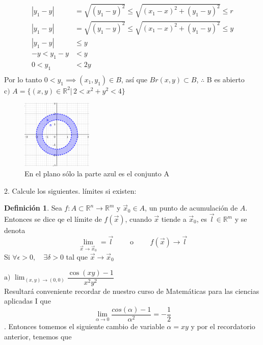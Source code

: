 \documentclass[letterpaper]{article}
\providecommand{\abs}[1]{\left|#1\right|}
\newcommand{\R}{\mathds{R}}
\renewcommand{\*}{\cdot}
\theoremstyle{definition}
\newtheorem{definition}{Definición}
\begin{document}
\begin{align*}
	\abs{y_1 - y} &= \sqrt{(y_1 -y)^2} \leq \sqrt{(x_1 - x)^2 + (y_1 - y)^2} \leq r\\
	\abs{y_1 - y} &= \sqrt{(y_1 -y)^2} \leq \sqrt{(x_1 - x)^2 + (y_1 - y)^2} \leq y\\
	\abs{y_1 - y} &\leq y\\
	-y<y_1 - y &< y\\
	0<y_1  &< 2y\\
\end{align*}
Por lo tanto $  0< y_1 \implies (x_1, y_1) \in B$, así que $ Br(x,y) \subset B $, $ \therefore  $ B es abierto\\



\noindent$\text{c) }A = \{ (x,y) \in \mathbb{R}^2 \vert \, 2 < x^2  + y^2 < 4\}$
\begin{figure}[h]
	\centering
	\includegraphics[width=0.3\textwidth]{1c}
	\caption{En el plano sólo la parte azul es el conjunto A}
\end{figure}


2.  Calcule los siguientes. límites si existen: 
\begin{definition}
	Sea $ f: A \subset \R^n \to \R^m $ y $ \vec{x}_0 \in A $, un punto de acumulación de $ A $. Entonces se dice qe el límite de $  f(\vec{x}) $, cuando $ \vec{x} $ tiende a $ \vec{x}_0 $, es $ \vec{\textit{l}} \in \R^m $ y se denota
	\[ \lim\limits_{\vec{x} \to \vec{x}_0} = \vec{\textit{l}} \qquad \text{ o } \qquad f(\vec{x}) \to \vec{\textit{l}} \]
	Si $ \forall \epsilon > 0, \quad \exists  \delta > 0 $ tal que $ \vec{x} \to \vec{x}_0 $
\end{definition}


\noindent$\text{a) }\displaystyle\lim_{(x,y) \to (0,0)} \dfrac{\cos(xy) - 1}{x^2y^2}$\\
Resultará conveniente recordar de nuestro curso de Matemáticas para las ciencias aplicadas I que $$ \lim\limits_{\alpha \to 0} \dfrac{cos(\alpha) - 1}{\alpha^2} = -\dfrac{1}{2} $$.  
Entonces tomemos el siguiente cambio de variable $ \alpha = xy $
y por el recordatorio anterior, tenemos que 
 
\end{document}

